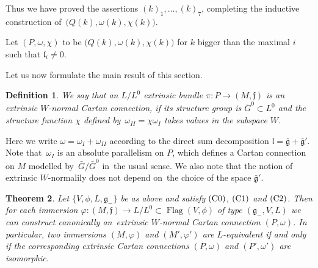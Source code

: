 \documentclass[10pt,a4paper]{amsart}
\newcommand{\geneg}{\mathfrak g _-}
\newcommand{\gebar}{\bar{\mathfrak g}}
\newcommand{\f}{\mathfrak f}
\newcommand{\lf}{\mathfrak l}
\newcommand{\om}{\omega}
\newcommand{\Flag}{\operatorname{Flag}}
\newtheorem{thm}{Theorem}[section]
\newtheorem{df}[thm]{Definition}
\numberwithin{equation}{section}
\begin{document}
Thus we have proved the assertions $(k)_1, \ldots , (k)_7 $,
completing the inductive construction of~$\big(Q(k), \omega(k), \chi(k) \big)$.

Let $(P,\omega ,\chi)$ to be $\big(Q(k),\omega(k),\chi(k)\big)$ for $k$ bigger than the maximal $i$ such that $\lf_i\ne 0$.


Let us now formulate the main result of this section.
\begin{df}
	We say that an $L/L^0$ extrinsic bundle $\pi\colon P\to (M,\f)$ is
	\emph{an extrinsic $W$-normal Cartan connection}, if its structure group is $\bar G^0\subset L^0$ and the structure function $\chi$ defined by~$\om_{II}=\chi \om_I$ takes values in the subspace $W$.
\end{df}
Here we write $ \omega = \omega_I + \omega_{II} $ according to the direct sum decomposition $ \lf = \gebar + \gebar'$. Note that~$\omega_I$ is an absolute parallelism on $P$, which defines a Cartan connection on $M$ modelled by~$\bar G / \bar G^0$ in~the usual sense. We also note that the notion of extrinsic $W$-normalily does not depend on~the choice of the space $\gebar'$.

\begin{thm}\label{thm:reduction}
	Let $\{ V, \phi, L, \geneg \} $ be as above and satisfy
	${\rm (C0)}$, ${\rm (C1)}$ and ${\rm (C2)}$. Then for each immersion $\varphi\colon (M, \f) \to
	L/L^0 \subset \Flag (V, \phi)$ of type $(\geneg, V, L)$ we can construct canonically an~ext\-ri\-nsic $W$-normal Cartan connection $(P,\om)$. 	In particular, two immersions $(M, \varphi)$ and $(M', \varphi ')$ 	are $L$-equivalent if and only if the corresponding extrinsic Cartan connections $(P,\omega)$ and $(P',\omega')$ are isomorphic.
\end{thm}
\end{document}
